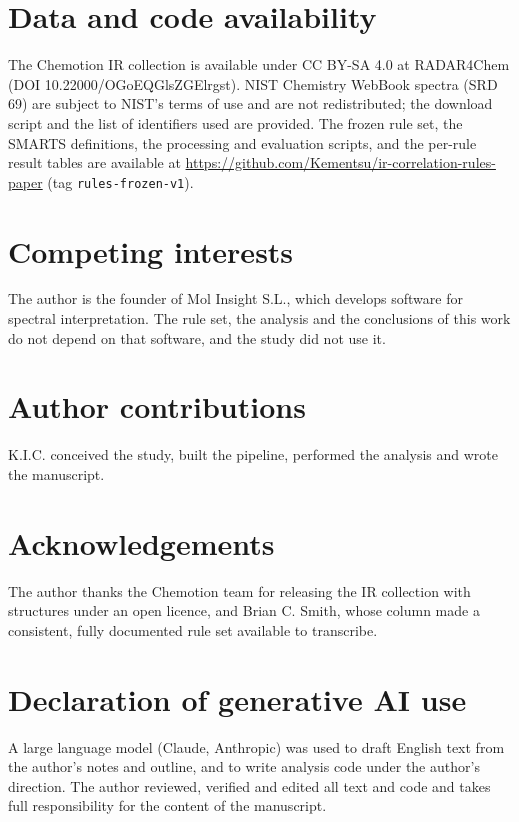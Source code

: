 \section*{Data and code availability}
The Chemotion IR collection is available under CC BY-SA 4.0 at RADAR4Chem (DOI 10.22000/OGoEQGlsZGElrgst). NIST Chemistry WebBook spectra (SRD 69) are subject to NIST's terms of use and are not redistributed; the download script and the list of identifiers used are provided. The frozen rule set, the SMARTS definitions, the processing and evaluation scripts, and the per-rule result tables are available at \url{https://github.com/Kementsu/ir-correlation-rules-paper} (tag \texttt{rules-frozen-v1}).

\section*{Competing interests}
The author is the founder of Mol Insight S.L., which develops software for spectral interpretation. The rule set, the analysis and the conclusions of this work do not depend on that software, and the study did not use it.

\section*{Author contributions}
K.I.C. conceived the study, built the pipeline, performed the analysis and wrote the manuscript.

\section*{Acknowledgements}
The author thanks the Chemotion team for releasing the IR collection with structures under an open licence, and Brian C. Smith, whose column made a consistent, fully documented rule set available to transcribe.

\section*{Declaration of generative AI use}
A large language model (Claude, Anthropic) was used to draft English text from the author's notes and outline, and to write analysis code under the author's direction. The author reviewed, verified and edited all text and code and takes full responsibility for the content of the manuscript.
